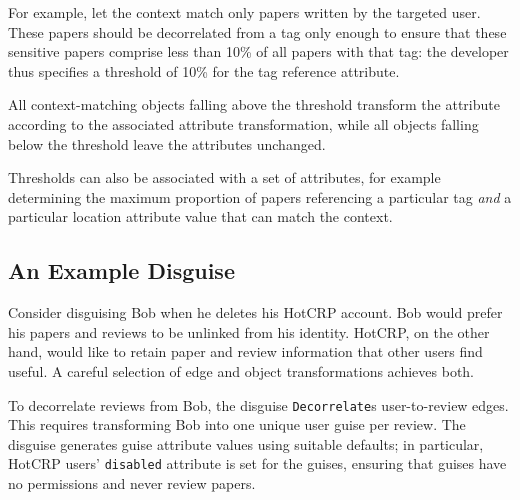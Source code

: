 For example, let the context match only papers written by the targeted user. These papers should be
decorrelated from a tag only enough to ensure that these sensitive papers comprise less than 10\% of
all papers with that tag: the developer thus specifies a threshold of 10\% for the tag reference
attribute.

All context-matching objects falling above the threshold transform the attribute according to the
associated attribute transformation, while all objects falling below the threshold leave the
attributes unchanged. 
%

Thresholds can also be associated with a set of
attributes, for example determining the maximum proportion of papers referencing a particular tag
\emph{and} a particular location attribute value that can match the context.



\subsection{An Example Disguise}
\label{design:eg}
%
Consider disguising Bob when he deletes his HotCRP account.
%
Bob would prefer his papers and reviews to be unlinked from his identity.
%
HotCRP, on the other hand, would like to retain paper and review information that other users
find useful.
%
A careful selection of edge and object transformations achieves both.
%

%
To decorrelate reviews from Bob, the disguise \texttt{Decorrelate}s user-to-review edges.
%
This requires transforming Bob into one unique user guise per review.
%
The disguise generates guise attribute values using suitable defaults;
%
in particular, HotCRP users' \texttt{disabled} attribute is set for the guises,
ensuring that guises have no permissions and never review papers.
%

